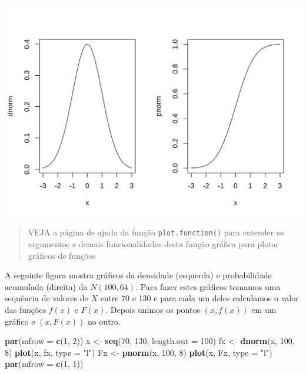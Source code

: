 \documentclass[10pt,a4paper]{book}
\newenvironment{Shaded}{\begin{snugshade}}{\end{snugshade}}
\newcommand{\KeywordTok}[1]{\textcolor[rgb]{0.13,0.29,0.53}{\textbf{#1}}}
\newcommand{\DataTypeTok}[1]{\textcolor[rgb]{0.13,0.29,0.53}{#1}}
\newcommand{\DecValTok}[1]{\textcolor[rgb]{0.00,0.00,0.81}{#1}}
\newcommand{\StringTok}[1]{\textcolor[rgb]{0.31,0.60,0.02}{#1}}
\newcommand{\NormalTok}[1]{#1}
\begin{document}
\begin{center}\includegraphics{figures/unnamed-chunk-342-1} \end{center}

\begin{quote}
VEJA a página de ajuda da função \texttt{plot.function()} para entender
os argumentos e demais funcionalidades desta função gráfica para plotar
gráficos de funções
\end{quote}

A seguinte figura mostra gráficos da densidade (esquerda) e
probabilidade acumulada (direita) da \(N(100, 64)\). Para fazer estes
gráficos tomamos uma sequência de valores de \(X\) entre 70 e 130 e para
cada um deles calculamos o valor das funções \(f(x)\) e \(F(x)\). Depois
unimos os pontos \((x,f(x))\) em um gráfico e \((x,F(x))\) no outro.

\begin{Shaded}
\begin{Highlighting}[]
\KeywordTok{par}\NormalTok{(}\DataTypeTok{mfrow =} \KeywordTok{c}\NormalTok{(}\DecValTok{1}\NormalTok{, }\DecValTok{2}\NormalTok{))}
\NormalTok{x <-}\StringTok{ }\KeywordTok{seq}\NormalTok{(}\DecValTok{70}\NormalTok{, }\DecValTok{130}\NormalTok{, }\DataTypeTok{length.out =} \DecValTok{100}\NormalTok{)}
\NormalTok{fx <-}\StringTok{ }\KeywordTok{dnorm}\NormalTok{(x, }\DecValTok{100}\NormalTok{, }\DecValTok{8}\NormalTok{)}
\KeywordTok{plot}\NormalTok{(x, fx, }\DataTypeTok{type =} \StringTok{"l"}\NormalTok{)}
\NormalTok{Fx <-}\StringTok{ }\KeywordTok{pnorm}\NormalTok{(x, }\DecValTok{100}\NormalTok{, }\DecValTok{8}\NormalTok{)}
\KeywordTok{plot}\NormalTok{(x, Fx, }\DataTypeTok{type =} \StringTok{"l"}\NormalTok{)}
\KeywordTok{par}\NormalTok{(}\DataTypeTok{mfrow =} \KeywordTok{c}\NormalTok{(}\DecValTok{1}\NormalTok{, }\DecValTok{1}\NormalTok{))}
\end{Highlighting}
\end{Shaded}
\end{document}
